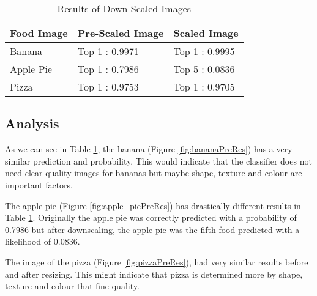 \begin{table}[]
\centering
\caption{Results of Down Scaled Images}
\label{scaledImages}
\begin{tabular}{|l|l|l|}
\hline
\textbf{Food Image}& \textbf{Pre-Scaled Image} & \textbf{Scaled Image}   \\ \hline
Banana     & Top 1 : 0.9971   & Top 1 : 0.9995 \\ \hline
Apple Pie  & Top 1 : 0.7986   & Top 5 : 0.0836 \\ \hline
Pizza      & Top 1 : 0.9753   & Top 1 : 0.9705 \\ \hline
\end{tabular}
\end{table}

\subsection*{Analysis}
As we can see in Table \ref{scaledImages}, the banana (Figure \ref{fig:bananaPreRes}) has a very similar prediction and probability.
This would indicate that the classifier does not need clear quality images for bananas but maybe shape, texture and colour are important factors.

The apple pie (Figure \ref{fig:apple_piePreRes}) has drastically different results in Table \ref{scaledImages}.
Originally the apple pie was correctly predicted with a probability of 0.7986 but after downscaling, the apple pie was the fifth food predicted with a likelihood of 0.0836.

The image of the pizza (Figure \ref{fig:pizzaPreRes}), had very similar results before and after resizing.
This might indicate that pizza is determined more by shape, texture and colour that fine quality.


